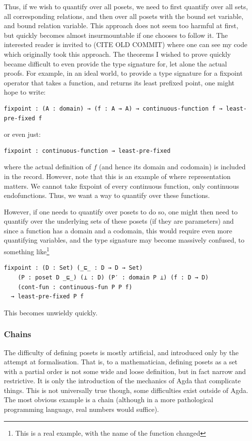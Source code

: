 \documentclass[12pt,a4paper,twoside,openright]{report}
\begin{document}
Thus, if we wish to quantify over all posets, we need to first quantify over all sets, all corresponding relations, and then over all posets with the bound set variable, and bound relation variable. This approach does not seem too harmful at first, but quickly becomes almost insurmountable if one chooses to follow it. The interested reader is invited to (CITE OLD COMMIT) where one can see my code which originally took this approach. The theorems I wished to prove quickly became difficult to even provide the type signature for, let alone the actual proofs. For example, in an ideal world, to provide a type signature for a fixpoint operator that takes a function, and returns its least prefixed point, one might hope to write:
\begin{verbatim}
fixpoint : (A : domain) → (f : A → A) → continuous-function f → least-pre-fixed f
\end{verbatim}
or even just:
\begin{verbatim}
fixpoint : continuous-function → least-pre-fixed
\end{verbatim}
where the actual definition of $f$ (and hence its domain and codomain) is included in the record. However, note that this is an example of where representation matters. We cannot take fixpoint of every continuous function, only continuous endofunctions. Thus, we want a way to quantify over these functions.

However, if one needs to quantify over posets to do so, one might then need to quantify over the underlying sets of these posets (if they are parameters) and since a function has a domain and a codomain, this would require even more quantifying variables, and the type signature may become massively confused, to something like\footnote{This is a real example, with the name of the function changed}
\begin{verbatim}
fixpoint : (D : Set) (_⊑_ : D → D → Set) 
    (P : poset D _⊑_) (⊥ : D) (P′ : domain P ⊥) (f : D → D) 
    (cont-fun : continuous-fun P P f) 
  → least-pre-fixed P f
\end{verbatim}

This becomes unwieldy quickly. 
\subsubsection{Chains}
The difficulty of defining posets is mostly artificial, and introduced only by the attempt at formalisation. That is, to a mathematician, defining posets as a set with a partial order is not some wide and loose definition, but in fact narrow and restrictive. It is only the introduction of the mechanics of Agda that complicate things. This is not universally true though, some difficulties exist outside of Agda. The most obvious example is a chain (although in a more pathological programming language, real numbers would suffice). 
\end{document}
